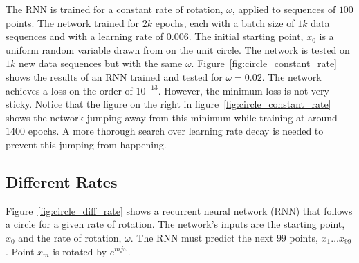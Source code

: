 The RNN is trained for a constant rate of rotation, $\omega$, applied to sequences of $100$ points.  The network trained for $2k$ epochs, each with a batch size of $1k$ data sequences and with a learning rate of $0.006$.  The initial starting point, $x_0$ is a uniform random variable drawn from on the unit circle. 
The network is tested on $1k$ new data sequences but with the same $\omega$.
Figure~\ref{fig:circle_constant_rate} shows the results of an RNN trained and tested for $\omega=0.02$.  
The network achieves a loss on the order of $10^{-13}$.  However, the minimum loss is not very sticky.  Notice that the figure on the right in figure~\ref{fig:circle_constant_rate} shows the network jumping away from this minimum while training at around $1400$ epochs.  A more thorough search over learning rate decay is needed to prevent this jumping from happening.

\subsection{Different Rates}


Figure~\ref{fig:circle_diff_rate} shows a recurrent neural network (RNN) that follows a circle for a given rate of rotation.
The network's inputs are the starting point, $x_0$ and the rate of rotation, $\omega$.
The RNN must predict the next $99$ points, $x_1 \ldots x_{99}$.  Point $x_m$ is rotated by $e^{mj\omega}$.

